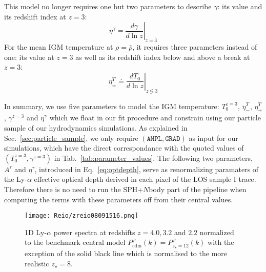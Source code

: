 This model no longer requires one but two parameters to describe $\gamma$: its value and its redshift index at $z=3$: 
\begin{equation}
\eta^\gamma = \left. \frac{d \gamma}{d \ln z} \right\vert_{z=3}
\end{equation}
For the mean IGM temperature at $\rho = \bar{\rho}$, it requires three parameters instead of one: its value at $z=3$ as well as its redshift index below and above a break at $z=3$: 
\begin{equation}
\eta^{T}_{\pm} \doteq \left. \frac{d T_0}{d \ln z} \right\vert_{z \lessgtr 3} 
\end{equation}

In summary, we use five parameters to model the IGM temperature: $T_0^{z=3}$, $\eta^{T}_{-}$, $\eta^{T}_{+}$, $\gamma^{z=3}$ and $\eta^\gamma$ which we float in our fit procedure and constrain using our particle sample of our hydrodynamics simulations. As explained in Sec.~\ref{sec:particle_sample}, we only require $\left( \texttt{AMPL}, \texttt{GRAD} \right)$ as input for our simulations, which have the direct correspondance with the quoted values of $\left( T_0^{z=3}, \gamma^{z=3} \right)$ in Tab.~\ref{tab:parameter_values}. The following two parameters, $A^\tau$ and $\eta^\tau$, introduced in Eq.~\ref{eq:optdepth}, serve as renormalizing paramaters of the Ly-$\alpha$ effective optical depth derived in each pixel of the LOS sample I trace. Therefore there is no need to run the SPH+$N$body part of the pipeline when computing the terms with these parameters off from their central values.\\

\begin{figure}
\begin{center}
\texttt{[image: Reio/zreio08091516.png]}
\caption{1D Ly-$\alpha$ power spectra at redshifts $z=4.0, 3.2$ and $2.2$ normalized to the benchmark central model $P^\varphi_{\mathrm{cdm}} (k) = P^\varphi_{z_\star = 12} (k)$ with the exception of the solid black line which is normalised to the more realistic $z_\star = 8$.}
\label{fig:zreio_flux}
\end{center}
\end{figure}

